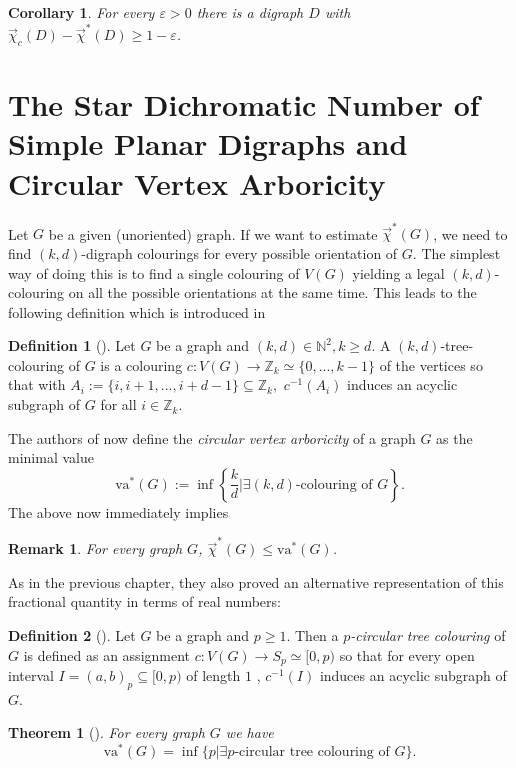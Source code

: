 \documentclass[fontsize=11pt,a4paper,DIV12]{scrartcl}
\theoremstyle{meiner}
\newtheorem{theorem}{Theorem}
\newtheorem{corollary}{Corollary}
\newtheorem{remark}{Remark}
\theoremstyle{definition}
\newtheorem{definition}{Definition}
\begin{document}
\begin{corollary}
For every $\varepsilon>0$ there is a digraph $D$ with $\vec{\chi}_c(D)-\vec{\chi}^\ast(D) \ge 1-\varepsilon$.
\end{corollary}

\section{The Star Dichromatic Number of Simple Planar Digraphs and Circular Vertex Arboricity} \label{va}
Let $G$ be a given (unoriented) graph. If we want to estimate $\vec{\chi}^\ast(G)$, we need to find $(k,d)$-digraph colourings for every possible orientation of $G$. The simplest way of doing this is to find a single colouring of $V(G)$ yielding a legal $(k,d)$-colouring on all the possible orientations at the same time. This leads to the following definition which is introduced in \cite{fracvert}
\begin{definition}[\cite{fracvert}] \label{DefVa}
Let $G$ be a graph and $(k,d) \in \mathbb{N}^2, k \ge d$. A $(k,d)$-tree-colouring of $G$ is a colouring $c:V(G) \rightarrow \mathbb{Z}_k \simeq \{0,...,k-1\}$ of the vertices so that with $A_i:=\{i,i+1,...,i+d-1\} \subseteq \mathbb{Z}_k,$ $c^{-1}(A_i)$ induces an acyclic subgraph of $G$ for all $i \in  \mathbb{Z}_k$.
\end{definition}
The authors of \cite{fracvert} now define the {\em circular vertex arboricity} of a graph $G$ as the minimal value
$$\text{va}^\ast(G):=\inf\left\{\frac{k}{d}\bigg\vert \exists (k,d)\text{-colouring of }G\right\}.$$
The above now immediately implies
\begin{remark} \label{rem}
For every graph $G$, $\vec{\chi}^\ast(G) \leq \text{va}^\ast(G)$.
\end{remark}
As in the previous chapter, they also proved an alternative representation of this fractional quantity in terms of real numbers:
\begin{definition}[\cite{fracvert}]
Let $G$ be a graph and $p \ge 1$. Then a {\em $p$-circular tree colouring} of $G$ is defined as an assignment $c:V(G) \rightarrow S_p \simeq [0,p)$ so that for every open interval $I=(a,b)_p \subseteq [0,p)$ of length $1$
, $c^{-1}(I)$ induces an acyclic subgraph of $G$.
\end{definition}
\begin{theorem}[\cite{fracvert}]
For every graph $G$ we have
$$\text{va}^\ast(G)=\inf\{p|\exists p\text{-circular tree colouring of }G\}.$$
\end{theorem}
\end{document}
